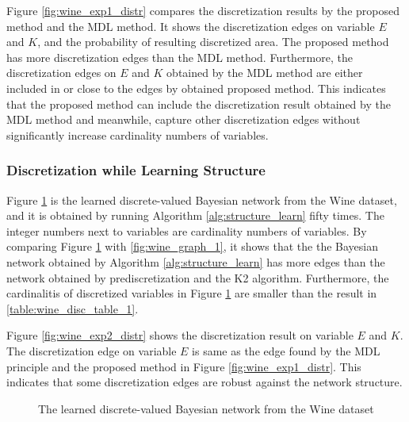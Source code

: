 Figure \ref{fig:wine_exp1_distr} compares the discretization results by the proposed method and the MDL method. It shows the discretization edges on variable $E$ and $K$, and the probability of resulting discretized area. The proposed method has more discretization edges than the MDL method. Furthermore, the discretization edges on $E$ and $K$ obtained by the MDL method are either included in or close to the edges by obtained proposed method. This indicates that the proposed method can include the discretization result obtained by the MDL method and meanwhile, capture other discretization edges without significantly increase cardinality numbers of variables.

%    

\subsubsection{Discretization while Learning Structure}
\label{subsubsec:wine_exp2}

Figure \ref{fig:wine_graph_2} is the learned discrete-valued Bayesian network from the Wine dataset, and it is obtained by running Algorithm \ref{alg:structure_learn} fifty times. The integer numbers next to variables are cardinality numbers of variables. By comparing Figure \ref{fig:wine_graph_2} with \ref{fig:wine_graph_1}, it shows that the the Bayesian network obtained by Algorithm \ref{alg:structure_learn} has more edges than the network obtained by prediscretization and the K2 algorithm. Furthermore, the cardinalitis of discretized variables in Figure \ref{fig:wine_graph_2} are smaller than the result in \ref{table:wine_disc_table_1}.

Figure \ref{fig:wine_exp2_distr} shows the discretization result on variable $E$ and $K$. The discretization edge on variable $E$ is same as the edge found by the MDL principle and the proposed method in Figure \ref{fig:wine_exp1_distr}. This indicates that some discretization edges are robust against the network structure.

\begin{figure}[ht]
  \centering
  \scalebox{0.7}{
    }
  \caption{The learned discrete-valued Bayesian network from the Wine dataset }
  \label{fig:wine_graph_2}
\end{figure}


